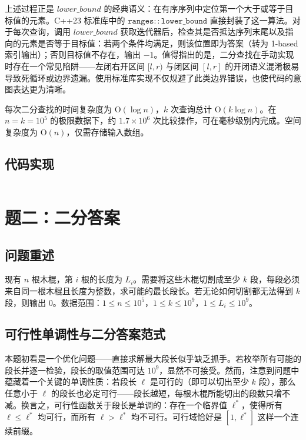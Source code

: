 \documentclass[12pt, a4paper]{academics}
\begin{document}
上述过程正是 $\mathit{lower\_bound}$ 的经典语义：在有序序列中定位第一个大于或等于目标值的元素。C++23 标准库中的 $\mathtt{ranges::lower\_bound}$ 直接封装了这一算法。对于每次查询，调用 $\mathit{lower\_bound}$ 获取迭代器后，检查其是否抵达序列末尾以及指向的元素是否等于目标值：若两个条件均满足，则该位置即为答案（转为 1-based 索引输出）；否则目标值不存在，输出 $-1$。值得指出的是，二分查找在手动实现时存在一个常见陷阱——左闭右开区间 $[l, r)$ 与闭区间 $[l, r]$ 的开闭语义混淆极易导致死循环或边界遗漏。使用标准库实现不仅规避了此类边界错误，也使代码的意图表达更为清晰。

每次二分查找的时间复杂度为 $\mathrm{O}(\log n)$，$k$ 次查询总计 $\mathrm{O}(k \log n)$。在 $n = k = 10^5$ 的极限数据下，约 $1.7 \times 10^6$ 次比较操作，可在毫秒级别内完成。空间复杂度为 $\mathrm{O}(n)$，仅需存储输入数组。

\subsection{代码实现}

\inputminted{c++}{../src/p1_binary_search.cpp}

\section{题二：二分答案}

\subsection{问题重述}

现有 $n$ 根木棍，第 $i$ 根的长度为 $L_i$。需要将这些木棍切割成至少 $k$ 段，每段必须来自同一根木棍且长度为整数，求可能的最长段长。若无论如何切割都无法得到 $k$ 段，则输出 $0$。数据范围：$1 \le n \le 10^5$，$1 \le k \le 10^9$，$1 \le L_i \le 10^9$。

\subsection{可行性单调性与二分答案范式}

本题初看是一个优化问题——直接求解最大段长似乎缺乏抓手。若枚举所有可能的段长并逐一检验，段长的取值范围可达 $10^9$，显然不可接受。然而，注意到问题中蕴藏着一个关键的单调性质：若段长 $\ell$ 是可行的（即可以切出至少 $k$ 段），那么任意小于 $\ell$ 的段长也必定可行——段长越短，每根木棍所能切出的段数只增不减。换言之，可行性函数关于段长是单调的：存在一个临界值 $\ell^*$，使得所有 $\ell \le \ell^*$ 均可行，而所有 $\ell > \ell^*$ 均不可行。可行域恰好是 $[1, \ell^*]$ 这样一个连续前缀。
\end{document}

